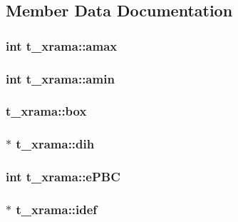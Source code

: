\subsection{\-Member \-Data \-Documentation}
\hypertarget{structt__xrama_a9b86d04d5bee01eb4a19535e4af33b3a}{
\subsubsection[{amax}]{\setlength{\rightskip}{0pt plus 5cm}int {\bf t\-\_\-xrama\-::amax}}}\label{structt__xrama_a9b86d04d5bee01eb4a19535e4af33b3a}
\hypertarget{structt__xrama_a1073cac665279d341f4e48c482f8ee56}{
\subsubsection[{amin}]{\setlength{\rightskip}{0pt plus 5cm}int {\bf t\-\_\-xrama\-::amin}}}\label{structt__xrama_a1073cac665279d341f4e48c482f8ee56}
\hypertarget{structt__xrama_af9253796fa84bcb079853ec5593cc8e7}{
\subsubsection[{box}]{ {\bf t\-\_\-xrama\-::box}}}\label{structt__xrama_af9253796fa84bcb079853ec5593cc8e7}
\hypertarget{structt__xrama_aae4c81bd4913112d8ea09487d0b27c9a}{
\subsubsection[{dih}]{ $\ast$ {\bf t\-\_\-xrama\-::dih}}}\label{structt__xrama_aae4c81bd4913112d8ea09487d0b27c9a}
\hypertarget{structt__xrama_a5ae3efcc47d0e64bb16ac9204ea308d1}{
\subsubsection[{e\-P\-B\-C}]{\setlength{\rightskip}{0pt plus 5cm}int {\bf t\-\_\-xrama\-::e\-P\-B\-C}}}\label{structt__xrama_a5ae3efcc47d0e64bb16ac9204ea308d1}
\hypertarget{structt__xrama_ad58aaf781616ee525cf5bb7bc96cdd93}{
\subsubsection[{idef}]{ $\ast$ {\bf t\-\_\-xrama\-::idef}}}\label{structt__xrama_ad58aaf781616ee525cf5bb7bc96cdd93}
